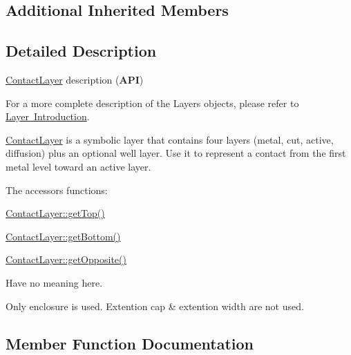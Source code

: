 \subsection*{Additional Inherited Members}


\subsection{Detailed Description}
\mbox{\hyperlink{classHurricane_1_1ContactLayer}{Contact\+Layer}} description ({\bfseries A\+PI}) 

For a more complete description of the Layers objects, please refer to \mbox{\hyperlink{classHurricane_1_1Layer_secLayerIntro}{Layer Introduction}}.

\mbox{\hyperlink{classHurricane_1_1ContactLayer}{Contact\+Layer}} is a symbolic layer that contains four layers (metal, cut, active, diffusion) plus an optional well layer. Use it to represent a contact from the first metal level toward an active layer.

The accessors functions\+: 
\begin{DoxyItemize}
\item \mbox{\hyperlink{classHurricane_1_1Layer_a5f7c43a29f3dd02a9ebccbcbf91d6727}{Contact\+Layer\+::get\+Top()}} 
\item \mbox{\hyperlink{classHurricane_1_1Layer_a4dab4552a219d2d900ed0b1245dc6580}{Contact\+Layer\+::get\+Bottom()}} 
\item \mbox{\hyperlink{classHurricane_1_1Layer_a69e76c09a56260169c4f5c145a35a47f}{Contact\+Layer\+::get\+Opposite()}} 
\end{DoxyItemize}Have no meaning here.

Only enclosure is used. Extention cap \& extention width are not used. 

\subsection{Member Function Documentation}
\mbox{\label{classHurricane_1_1ContactLayer_ab5f2e78865e0311fcabf25e1aa94bf09}} 

